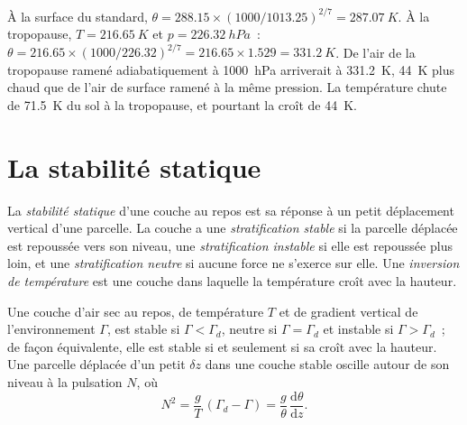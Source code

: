 \begin{example}\label{ex:b1:fluid-envelopes-structure:tropopause}
À la surface du standard, $\theta = 288.15 \times (1000/1013.25)^{2/7} =
\qty{287.07}{K}$. À la tropopause, $T = \qty{216.65}{K}$ et $p =
\qty{226.32}{hPa}$~: $\theta = 216.65 \times (1000/226.32)^{2/7} = 216.65 \times
1.529 = \qty{331.2}{K}$. De l'air de la tropopause ramené adiabatiquement à
\qty{1000}{hPa} arriverait à \qty{331.2}{K}, \qty{44}{K} plus chaud que de l'air de surface
ramené à la même pression. La température chute de \qty{71.5}{K} du
sol à la tropopause, et pourtant la  croît de
\qty{44}{K}.
\end{example}

\section{La stabilité statique}\label{sec:b1:fluid-envelopes-structure:stability}

\begin{definition}\label{def:b1:fluid-envelopes-structure:stability}
La \emph{stabilité statique} d'une couche au repos est sa
réponse à un petit déplacement vertical d'une parcelle. La couche a une
\emph{stratification stable} si la parcelle déplacée
est repoussée vers son niveau, une \emph{stratification
instable} si elle est repoussée plus loin,
et une \emph{stratification neutre} si aucune force
ne s'exerce sur elle. Une \emph{inversion de température} est une
couche dans laquelle la température croît avec la hauteur.
\end{definition}

\begin{theorem}\label{thm:b1:fluid-envelopes-structure:stability}
Une couche d'air sec au repos, de température $T$ et de gradient vertical de l'environnement
$\Gamma$, est stable si $\Gamma < \Gamma_d$, neutre si $\Gamma = \Gamma_d$ et
instable si $\Gamma > \Gamma_d$~; de façon équivalente, elle est stable si et seulement si sa
 croît avec la hauteur. Une parcelle déplacée d'un petit
$\delta z$ dans une couche stable oscille autour de son niveau à la
pulsation $N$, où
\[
  N^2 = \frac{g}{T}\,(\Gamma_d - \Gamma) = \frac{g}{\theta}\,\frac{\mathrm d\theta}{\mathrm dz}.
\]
\end{theorem}

